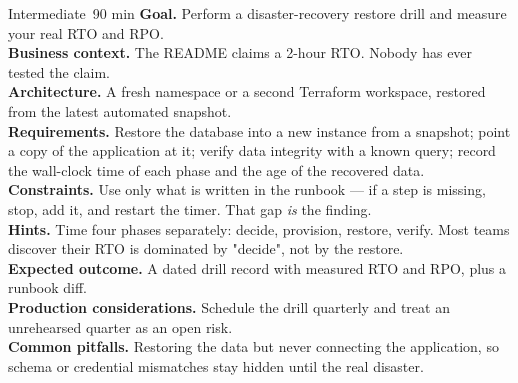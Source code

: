 \begin{minilab}{Intermediate}{~90 min}
\textbf{Goal.} Perform a disaster-recovery restore drill and measure your real RTO and RPO.\\
\textbf{Business context.} The README claims a 2-hour RTO. Nobody has ever tested the claim.\\
\textbf{Architecture.} A fresh namespace or a second Terraform workspace, restored from the latest automated snapshot.\\
\textbf{Requirements.} Restore the database into a new instance from a snapshot; point a copy of the application at it; verify data integrity with a known query; record the wall-clock time of each phase and the age of the recovered data.\\
\textbf{Constraints.} Use only what is written in the runbook --- if a step is missing, stop, add it, and restart the timer. That gap \emph{is} the finding.\\
\textbf{Hints.} Time four phases separately: decide, provision, restore, verify. Most teams discover their RTO is dominated by "decide", not by the restore.\\
\textbf{Expected outcome.} A dated drill record with measured RTO and RPO, plus a runbook diff.\\
\textbf{Production considerations.} Schedule the drill quarterly and treat an unrehearsed quarter as an open risk.\\
\textbf{Common pitfalls.} Restoring the data but never connecting the application, so schema or credential mismatches stay hidden until the real disaster.
\end{minilab}

